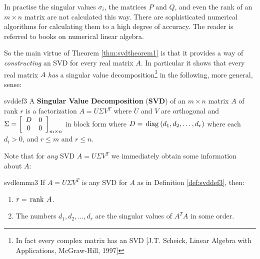 In practise the singular values $\sigma_{i}$, the matrices $P$ and $Q$, and
even the rank of an $m\times n$ matrix are not calculated this way. There
are sophisticated numerical algorithms for calculating them to a high degree
of accuracy. The reader is referred to books on numerical linear algebra.

So the main virtue of Theorem \ref{thm:svdtheorem1} is that it provides a way of \emph{constructing} an SVD for every real matrix $A$. In particular it shows that
every real matrix $A$ \emph{has} a singular value decomposition\footnote{In fact every complex matrix has an SVD [J.T. Scheick, Linear Algebra with
Applications, McGraw-Hill, 1997]} in the following, more general,
sense:

\begin{definition}{}{svddef3}
A \textbf{Singular Value Decomposition} (\textbf{SVD}) of an $m\times n$ matrix $A$ of rank $r$ is a factorization $A=U\Sigma V^{T}$ where $U$ and $V$ are orthogonal and $\Sigma =  
\left[ 
\begin{array}{cc}
D & 0 \\ 
0 & 0
\end{array}
\right]_{m\times n}$ in block form where $D=\thinspace\operatorname{diag\medspace}(d_{1},d_{2},\ldots ,d_{r})$ where each $d_{i}>0$, and $r\leq m$ and $r\leq n$.
\end{definition}

\noindent Note that for \emph{any} SVD $A=U\Sigma V^{T}$ we immediately
obtain some information about $A$:

\begin{lemma}{}{svdlemma3} 
If $A=U\Sigma V^{T}$ is any SVD for $A$ as in Definition \ref{def:svddef3}, then:

\begin{enumerate}
\item $r=\thinspace\operatorname{rank\medspace}A$.

\item The numbers $d_{1},d_{2},\dots ,d_{r}$ are the singular values of $A^{T}A$ in some order.
\end{enumerate}
\end{lemma}

